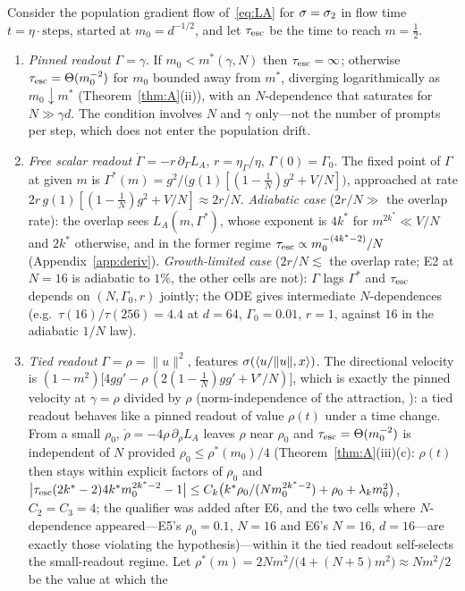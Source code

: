 \begin{proposition}
\label{prop:shrink}
Consider the population gradient flow of~\eqref{eq:LA} for $\sigma=\sigma_2$ in flow time $t=\eta\cdot\text{steps}$, started at $m_0=d^{-1/2}$,
and let $\tau_{\rm esc}$ be the time to reach $m=\tfrac12$.
\begin{enumerate}
\item[(a)] \emph{Pinned readout} $\Gamma=\gamma$.
If $m_0<m^*(\gamma,N)$ then $\tau_{\rm esc}=\infty$; otherwise $\tau_{\rm esc}=\Theta(m_0^{-2})$ for $m_0$ bounded away from $m^*$, diverging logarithmically as $m_0\downarrow m^*$ (Theorem~\ref{thm:A}(ii)), with an $N$-dependence that saturates for $N\gg\gamma d$.
The condition involves $N$ and $\gamma$ only---not the number of prompts per step, which does not enter the population drift.
\item[(b)] \emph{Free scalar readout} $\dot\Gamma=-r\,\partial_\Gamma L_A$, $r=\eta_\Gamma/\eta$, $\Gamma(0)=\Gamma_0$. The fixed point of $\Gamma$ at given $m$ is
$\Gamma^*(m)=g^2/\big(g(1)[(1-\tfrac1N)g^2+V/N]\big)$, approached at rate $2r\,g(1)[(1-\tfrac1N)g^2+V/N]\approx2r/N$. \emph{Adiabatic case}
($2r/N\gg$ the overlap rate): the overlap sees $L_A(m,\Gamma^*)$, whose exponent is $4k^*$ for $m^{2k^*}\ll V/N$ and $2k^*$ otherwise, and in the
former regime $\tau_{\rm esc}\propto m_0^{-(4k^*-2)}/N$ (Appendix~\ref{app:deriv}). \emph{Growth-limited case} ($2r/N\lesssim$ the overlap rate; E2 at $N=16$ is adiabatic to $1\%$, the other cells are not): $\Gamma$ lags $\Gamma^*$ and $\tau_{\rm esc}$ depends on $(N,\Gamma_0,r)$ jointly; the ODE gives intermediate
$N$-dependences (e.g.\ $\tau(16)/\tau(256)=4.4$ at $d=64$, $\Gamma_0=0.01$, $r=1$, against $16$ in the adiabatic $1/N$ law).
\item[(c)] \emph{Tied readout} $\Gamma=\rho=\|u\|^2$, features $\sigma(\langle u/\|u\|,x\rangle)$. The directional velocity is
$(1-m^2)\big[4gg'-\rho\,(2(1-\tfrac1N)gg'+V'/N)\big]$, which is exactly the pinned velocity at $\gamma=\rho$ divided by $\rho$ (norm-independence
of the attraction, \citealp[Lemma~B.1]{ren2025emergence}): a tied readout behaves like a pinned readout of value $\rho(t)$ under a time
change. From a small $\rho_0$, $\dot\rho=-4\rho\,\partial_\rho L_A$ leaves $\rho$ near $\rho_0$ and $\tau_{\rm esc}=\Theta(m_0^{-2})$ is independent of
$N$ provided $\rho_0\le\rho^*(m_0)/4$ (Theorem~\ref{thm:A}(iii)(c): $\rho(t)$ then stays within explicit factors of $\rho_0$ and $\big|\tau_{\rm esc}(2k^*-2)4k^*m_0^{2k^*-2}-1\big|\le C_k\big(k^*\rho_0/(Nm_0^{2k^*-2})+\rho_0+\lambda_km_0^2\big)$, $C_2=C_3=4$; the qualifier was added after E6, and the two cells where $N$-dependence appeared---E5's $\rho_0=0.1$, $N=16$ and E6's $N=16$, $d=16$---are exactly those violating the hypothesis)---within it the tied readout self-selects the small-readout regime. Let $\rho^*(m)=2Nm^2/\big(4+(N+5)m^2\big)\approx Nm^2/2$ be the value at which the

\end{enumerate}
\end{proposition}
